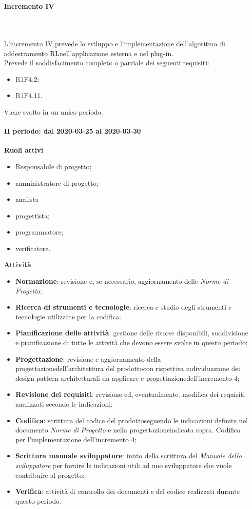 \paragraph{Incremento IV} \mbox{} \\ \\
L'incremento IV prevede lo sviluppo e l'implementazione dell'algoritmo di addestramento RL\glosp nell'applicazione esterna e nel plug-in.
\\Prevede il soddisfacimento completo o parziale dei seguenti requisiti:
\begin{itemize}
	\item R1F4.2;
	\item R1F4.11. 
\end{itemize}
Viene svolto in un unico periodo.
\mbox{} \\ \\ \textbf{II periodo: dal 2020-03-25 al 2020-03-30} \mbox{} \\ \\
\textbf{Ruoli attivi}
\begin{itemize}
	\item Responsabile di progetto\glo;
	\item amministratore di progetto\glo;
	\item analista
	\item progettista;
	\item programmatore;
	\item verificatore.
\end{itemize}
\textbf{Attività} 
\begin{itemize}
	\item \textbf{Normazione}: revisione e, se necessario, aggiornamento delle \textit{Norme di Progetto};
	\item \textbf{Ricerca di strumenti e tecnologie}: ricerca e studio degli strumenti e tecnologie utilizzate per la codifica;
	\item \textbf{Pianificazione delle attività}: gestione delle risorse disponibili, suddivisione e pianificazione di tutte le attività che devono essere svolte in questo periodo;
	\item \textbf{Progettazione}\glo: revisione e aggiornamento della progettazione\glosp dell'architettura del prodotto\glosp con rispettiva individuazione dei design pattern architetturali da applicare e progettazione\glosp dell'incremento 4; 
	\item \textbf{Revisione dei requisiti}: revisione ed, eventualmente, modifica dei requisiti analizzati secondo le indicazioni; 
	\item \textbf{Codifica}: scrittura del codice del prodotto\glosp seguendo le indicazioni definite nel documento \textit{Norme di Progetto} e nella progettazione\glosp indicata sopra. Codifica per l'implementazione dell'incremento 4;
	\item \textbf{Scrittura manuale sviluppatore}: inizio della scrittura del \textit{Manuale dello sviluppatore} per fornire le indicazioni utili ad uno sviluppatore che vuole contribuire al progetto\glo; 
	\item \textbf{Verifica}: attività di controllo dei documenti e del codice realizzati durante questo periodo.
\end{itemize}
